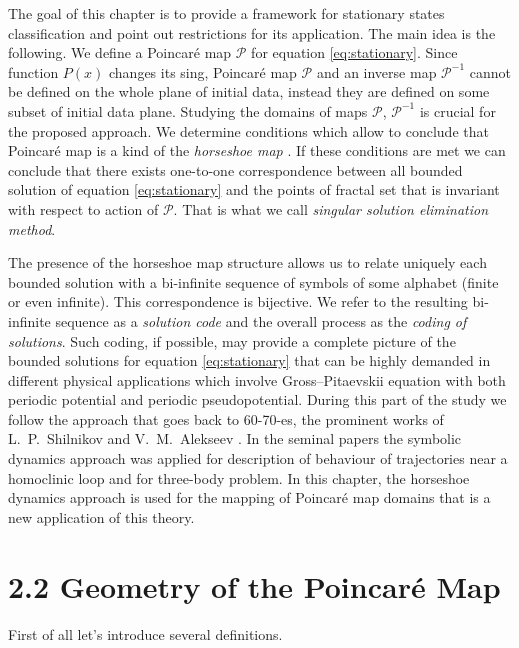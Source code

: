 The goal of this chapter is to provide a framework for stationary states classification and point out restrictions for its application.
The main idea is the following.
We define a Poincar\'e map $\mathcal{P}$ for equation \eqref{eq:stationary}.
Since function $P(x)$ changes its sing, Poincar\'e map $\mathcal{P}$ and an inverse map $\mathcal{P}^{-1}$ cannot be defined on the whole plane of initial data, instead they are defined on some subset of initial data plane.
Studying the domains of maps $\mathcal{P}$, $\mathcal{P}^{-1}$ is crucial for the proposed approach.
We determine conditions which allow to conclude that Poincar\'e map is a kind of the {\it horseshoe map} \cite[Chapter 5]{GuekenheimerHolmes}.
If these conditions are met we can conclude that there exists one-to-one correspondence between all bounded solution of equation \eqref{eq:stationary} and the points of fractal set that is invariant with respect to action of $\mathcal{P}$.
That is what we call {\it singular solution elimination method}.

The presence of the horseshoe map structure allows us to relate uniquely each bounded solution with a bi-infinite sequence of symbols of some alphabet (finite or even infinite).
This correspondence is bijective.
We refer to the resulting bi-infinite sequence as a {\it solution code} and the overall process as the {\it coding of solutions}.
Such coding, if possible, may provide a complete picture of the bounded solutions for equation \eqref{eq:stationary} that can be highly demanded in different physical applications which involve Gross--Pitaevskii equation with both periodic potential and periodic pseudopotential.
During this part of the study we follow the approach that goes back to 60-70-es, the prominent works of L.~P.~Shilnikov \cite{Shilnikov} and V.~M.~Alekseev \cite{Alekseev}.
In the seminal papers the symbolic dynamics approach was applied for description of behaviour of trajectories near a homoclinic loop and for three-body problem.
In this chapter, the horseshoe dynamics approach is used for the mapping of Poincar\'e map domains that is a new application of this theory.

\section*{2.2 Geometry of the Poincar\'e Map}

First of all let's introduce several definitions.

